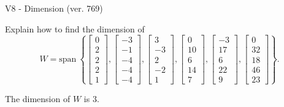 \begin{exercise}
  \begin{exerciseTitle}V8 - Dimension (ver. 769)\end{exerciseTitle}
  \begin{exerciseStatement}
    Explain how to find the dimension of 
\[W=\mathrm{span}\ \left\{\left[\begin{array}{r}
0 \\
2 \\
2 \\
2 \\
1
\end{array}\right] , \left[\begin{array}{r}
-3 \\
-1 \\
-4 \\
-4 \\
-4
\end{array}\right] , \left[\begin{array}{r}
3 \\
-3 \\
2 \\
-2 \\
1
\end{array}\right] , \left[\begin{array}{r}
0 \\
10 \\
6 \\
14 \\
7
\end{array}\right] , \left[\begin{array}{r}
-3 \\
17 \\
6 \\
22 \\
9
\end{array}\right] , \left[\begin{array}{r}
0 \\
32 \\
18 \\
46 \\
23
\end{array}\right]\right\}.\]



  \end{exerciseStatement}
  \begin{exerciseAnswer}
   The dimension of \(W\) is  \(3\).
  


  \end{exerciseAnswer}
\end{exercise}